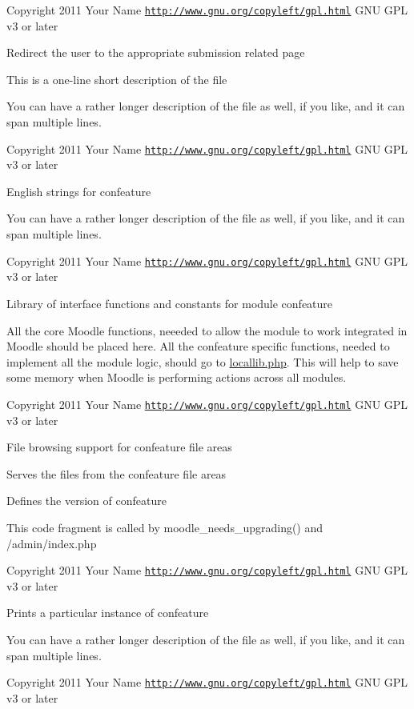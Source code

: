 \begin{DoxyCopyright}{Copyright}
2011 Your Name  \href{http://www.gnu.org/copyleft/gpl.html}{\tt http\-://www.\-gnu.\-org/copyleft/gpl.\-html} G\-N\-U G\-P\-L v3 or later
\end{DoxyCopyright}
Redirect the user to the appropriate submission related page

This is a one-\/line short description of the file

You can have a rather longer description of the file as well, if you like, and it can span multiple lines.

\begin{DoxyCopyright}{Copyright}
2011 Your Name  \href{http://www.gnu.org/copyleft/gpl.html}{\tt http\-://www.\-gnu.\-org/copyleft/gpl.\-html} G\-N\-U G\-P\-L v3 or later
\end{DoxyCopyright}
English strings for confeature

You can have a rather longer description of the file as well, if you like, and it can span multiple lines.

\begin{DoxyCopyright}{Copyright}
2011 Your Name  \href{http://www.gnu.org/copyleft/gpl.html}{\tt http\-://www.\-gnu.\-org/copyleft/gpl.\-html} G\-N\-U G\-P\-L v3 or later
\end{DoxyCopyright}
Library of interface functions and constants for module confeature

All the core Moodle functions, neeeded to allow the module to work integrated in Moodle should be placed here. All the confeature specific functions, needed to implement all the module logic, should go to \hyperlink{locallib_8php}{locallib.\-php}. This will help to save some memory when Moodle is performing actions across all modules.

\begin{DoxyCopyright}{Copyright}
2011 Your Name  \href{http://www.gnu.org/copyleft/gpl.html}{\tt http\-://www.\-gnu.\-org/copyleft/gpl.\-html} G\-N\-U G\-P\-L v3 or later
\end{DoxyCopyright}
File browsing support for confeature file areas

Serves the files from the confeature file areas

Defines the version of confeature

This code fragment is called by moodle\-\_\-needs\-\_\-upgrading() and /admin/index.php

\begin{DoxyCopyright}{Copyright}
2011 Your Name  \href{http://www.gnu.org/copyleft/gpl.html}{\tt http\-://www.\-gnu.\-org/copyleft/gpl.\-html} G\-N\-U G\-P\-L v3 or later
\end{DoxyCopyright}
Prints a particular instance of confeature

You can have a rather longer description of the file as well, if you like, and it can span multiple lines.

\begin{DoxyCopyright}{Copyright}
2011 Your Name  \href{http://www.gnu.org/copyleft/gpl.html}{\tt http\-://www.\-gnu.\-org/copyleft/gpl.\-html} G\-N\-U G\-P\-L v3 or later 
\end{DoxyCopyright}
